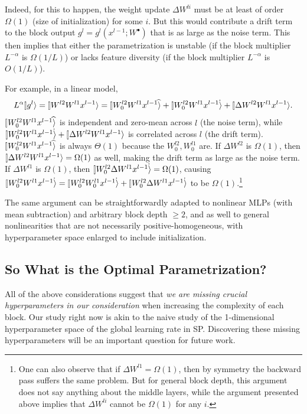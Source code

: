 \documentclass{article}
\theoremstyle{plain}
\theoremstyle{definition}
\begin{document}
Indeed, for this to happen, the weight update $\Delta W^{li}$ must be at least of order $\Omega(1)$ (size of initialization) for some $i$.  But this would contribute a drift term to the block output $g^l = g^l(x^{l-1}; W^{\bullet})$ that is as large as the noise term.
This then implies that either the parametrization is unstable (if the block multiplier $L^{-\alpha}$ is  $\Omega(1/{L})$) or lacks feature diversity (if the block multiplier $L^{-\alpha}$ is $O(1/L)$).

For example, in a linear model, $$L^{\alpha}\ket{g^l} = \ket{W^{l2} W^{l1} x^{l-1}} = \hatket{W_0^{l2} W^{l1} x^{l-1}} + \dotket{W_0^{l2} W^{l1} x^{l-1}} + \ket{\Delta W^{l2} W^{l1} x^{l-1}}.$$ 
$\hatket{W_0^{l2} W^{l1} x^{l-1}}$ is independent and zero-mean across $l$ (the noise term), while $\dotket{W_0^{l2} W^{l1} x^{l-1}} + \ket{\Delta W^{l2} W^{l1} x^{l-1}}$ is correlated across $l$ (the drift term).
$\hatket{W_0^{l2} W^{l1} x^{l-1}}$ is always $\Theta(1)$ because the $W^{l2}_0, W^{l1}_0$ are.
If $\Delta W^{l2}$ is $\Omega(1)$, then $\ket{\Delta W^{l2} W^{l1} x^{l-1}} = \Omega(1)$ as well, making the drift term as large as the noise term.
If $\Delta W^{l1}$ is $\Omega(1)$, then $\dotket{W_0^{l2} \Delta W^{l1} x^{l-1}} = \Omega(1)$, causing $\dotket{W_0^{l2} W^{l1} x^{l-1}} = \dotket{W_0^{l2} W_0^{l1} x^{l-1}} + \dotket{W_0^{l2} \Delta W^{l1} x^{l-1}}$ to be $\Omega(1)$.\footnote{One can also observe that if $\Delta W^{l1} = \Omega(1)$, then by symmetry the backward pass suffers the same problem. But for general block depth, this argument does not say anything about the middle layers, while the argument presented above implies that $\Delta W^{li}$ cannot be $\Omega(1)$ for any $i$.}

The same argument can be straightforwardly adapted to nonlinear MLPs (with mean subtraction) and arbitrary block depth $\ge 2$, and as well to general nonlinearities that are not necessarily positive-homogeneous, with hyperparameter space enlarged to include initialization.

\subsection{So What is the Optimal Parametrization?}

All of the above considerations suggest that \emph{we are missing crucial hyperparameters in our consideration} when increasing the complexity of each block.
Our study right now is akin to the naive study of the 1-dimensional hyperparameter space of the global learning rate in SP.
Discovering these missing hyperparameters will be an important question for future work.
\clearpage{}%
\end{document}
